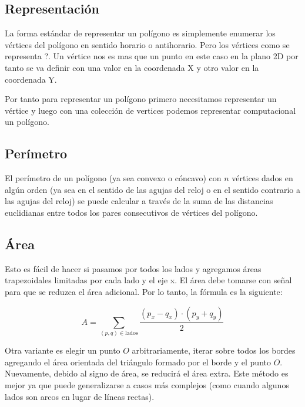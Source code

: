 


\subsection{Representación}

La forma estándar de representar un polígono es simplemente enumerar los vértices del polígono
en sentido horario o antihorario. Pero los vértices como se representa ?. Un vértice nos es mas que un punto en este caso en la plano 2D por tanto se va definir con una valor en la coordenada X y otro valor en la coordenada Y.

Por tanto para representar un polígono primero necesitamos representar un vértice y luego con una colección de vertices podemos representar computacional un polígono.

\subsection{Perímetro}

El perímetro de un polígono (ya sea convexo o cóncavo) con $n$ vértices dados en algún orden
(ya sea en el sentido de las agujas del reloj o en el sentido contrario a las agujas del reloj) se puede calcular a través de la suma de las distancias euclidianas entre todos los pares consecutivos de vértices del polígono.

\subsection{Área}

Esto es fácil de hacer si pasamos por todos los lados y agregamos áreas trapezoidales limitadas por cada lado y el eje x. El área debe tomarse con señal para que se reduzca el área adicional. Por lo tanto, la fórmula es la siguiente:


$$ A = \sum_{(p,q)\in \text{lados}} \frac{(p_x - q_x) \cdot (p_y + q_y)}{2} $$



Otra variante es elegir un punto $O$ arbitrariamente, iterar sobre todos los bordes agregando el área orientada del triángulo formado por el borde y el punto $O$. Nuevamente, debido al signo de área, se reducirá el área extra. Este método es mejor ya que puede generalizarse a casos más complejos (como cuando algunos lados son arcos en lugar de líneas rectas).


